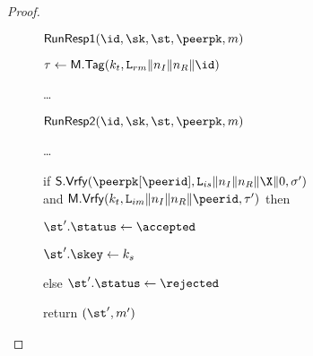 \begin{proof}
\begin{collectinmacro}{\SIGMIProofSignatureMAC}{}{}
\begin{figure}[tp]
\begin{minipage}[t]{0.49\textwidth}
\begin{oracle}{$\RunRespI(\id,\sk,\st,\peerpk,m)$}
			\item $\tau \gets \MACScheme.\MACTag(\kt, \labelrm\|\nonce_I\|\nonce_R\|\id)$
			\skipline
			\item \dots
			\item[] %
		\end{oracle}

		\ExptSepSpace

		\begin{oracle}{$\RunRespII(\id,\sk,\st,\peerpk,m)$}
			\item \dots
			\item if $\SIGScheme.\SIGVerify(\peerpk[\peerid], \labelis\|\nonce_I\|\nonce_R\|\X\|\Y, \sigma')$\\
				and $\MACScheme.\MACVerify(\kt, \labelim\|\nonce_I\|\nonce_R\|\peerid, \tau')$ then
			\item \hindent {}\newline
				\null \hindent\hindent {}
			\item \hindent \hindent \gamechange{$\bad[S] \gets \true$} 
			\skipline
			\item[]
			\skipline
			\item \hindent $\st'.\status \gets \accepted$
			\item \hindent $\st'.\skey \gets \ks$
			\item else $\st'.\status \gets \rejected$
			\item return $(\st', m')$
		\end{oracle}
	\end{minipage}
	\begin{minipage}[t]{0.49\textwidth}


\end{minipage}
\end{figure}
\end{collectinmacro}
\end{proof}

